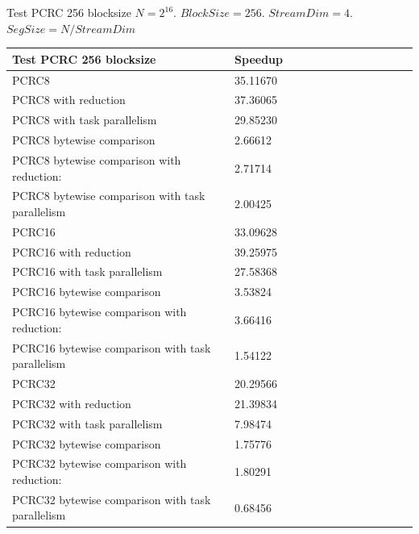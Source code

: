 \documentclass[10pt]{beamer}
\begin{document}
\begin{frame}[fragile]{Test PCRC 256 blocksize}
$N=2^{16}$. $BlockSize=256$. $StreamDim=4$. $SegSize=N/StreamDim$
\begin{footnotesize}
\begin{tabular}{l|l|l|l|l|r|r|r|r|r|r||c|c|}
\toprule
\textbf{Test PCRC 256 blocksize} & \textbf{Speedup} \\
\midrule
PCRC8                                           &	35.11670 \\
PCRC8 with reduction                            &	37.36065 \\
PCRC8 with task parallelism                     &	29.85230 \\
PCRC8 bytewise comparison                       &	2.66612  \\
PCRC8 bytewise comparison with reduction:       &	2.71714  \\
PCRC8 bytewise comparison with task parallelism &	2.00425  \\
PCRC16                                           &	33.09628 \\
PCRC16 with reduction                            &	39.25975 \\
PCRC16 with task parallelism                     &	27.58368 \\
PCRC16 bytewise comparison                       &	3.53824  \\
PCRC16 bytewise comparison with reduction:       &	3.66416  \\
PCRC16 bytewise comparison with task parallelism &	1.54122  \\
PCRC32                                           &	20.29566 \\
PCRC32 with reduction                            &	21.39834 \\
PCRC32 with task parallelism                     &	7.98474  \\
PCRC32 bytewise comparison                       &	1.75776  \\
PCRC32 bytewise comparison with reduction:       &	1.80291  \\
PCRC32 bytewise comparison with task parallelism &	0.68456  \\
\bottomrule
\end{tabular}
\end{footnotesize}
\end{frame}
\end{document}
